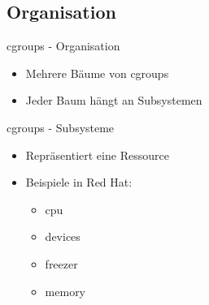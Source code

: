 \documentclass[14pt]{beamer}
\begin{document}
    \subsection{Organisation}
    \begin{frame}{cgroups - Organisation}
    	\begin{itemize}
        \item Mehrere Bäume von cgroups
        \item Jeder Baum hängt an Subsystemen
    	\end{itemize}
    \end{frame}
    \begin{frame}{cgroups - Subsysteme}
    	\begin{itemize}
        \item Repräsentiert eine Ressource
        \item Beispiele in Red Hat:
        	\begin{itemize}
        	\item cpu
            \item devices
            \item freezer
            \item memory
        	\end{itemize}
    	\end{itemize}
    \end{frame}
    
\end{document}
